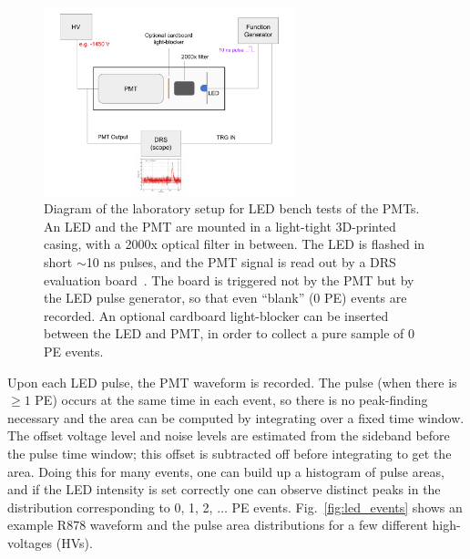 {\begin{figure}[t]
  \begin{center}
    \includegraphics[width=0.650\textwidth]{figs/milliq/pmt_setup.pdf}
    \caption{Diagram of the laboratory setup for LED bench tests of the PMTs.
      An LED and the PMT are mounted in a light-tight 3D-printed casing,
      with a 2000x optical filter in between. The LED is flashed in
      short $\sim$10 ns pulses, and the PMT signal is read out by
      a DRS evaluation board~\cite{drs}. The board is triggered not by the 
      PMT but by the LED pulse generator, so that even ``blank'' (0 PE) events
      are recorded. An optional cardboard light-blocker can be inserted between
      the LED and PMT, in order to collect a pure sample of 0 PE events.
            }
    \label{fig:pmt_setup}
  \end{center}
\end{figure}

Upon each LED pulse, the PMT waveform is recorded. The pulse (when there is $\geq1$ PE)
occurs at the same time in each event, so there is no peak-finding necessary and the 
area can be computed by integrating over a fixed time window. The offset voltage level
and noise levels are estimated from the sideband before the pulse time window; this offset
is subtracted off before integrating to get the area. Doing this for many
events, one can build up a histogram of pulse areas, and if the LED intensity is
set correctly one can observe distinct peaks in the distribution corresponding
to 0, 1, 2, $\dots$ PE events. Fig.~\ref{fig:led_events} shows an example
R878 waveform and the pulse area distributions for a few different 
high-voltages (HVs).

}
